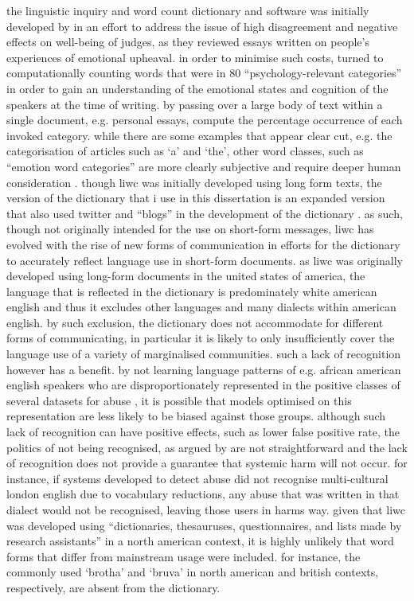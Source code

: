 the linguistic inquiry and word count dictionary and software was initially developed by \citet{pennebaker:2001} in an effort to address the issue of high disagreement and negative effects on well-being of judges, as they reviewed essays written on people's experiences of emotional upheaval. 
in order to minimise such costs, \citet{pennebaker:2001} turned to computationally counting words that were in $80$ ``psychology-relevant categories'' in order to gain an understanding of the emotional states and cognition of the speakers at the time of writing.
by passing over a large body of text within a single document, e.g. personal essays, \citet{pennebaker:2001} compute the percentage occurrence of each invoked category.
while there are some examples that appear clear cut, e.g. the categorisation of articles such as `a' and `the', other word classes, such as ``emotion word categories'' are more clearly subjective and require deeper human consideration \citep{tausczik:2010}.
though liwc was initially developed using long form texts, the version of the dictionary that i use in this dissertation is an expanded version that also used twitter and ``blogs'' in the development of the dictionary \citep{pennebaker:2015}.
as such, though not originally intended for the use on short-form messages, liwc has evolved with the rise of new forms of communication in efforts for the dictionary to accurately reflect language use in short-form documents.
as liwc was originally developed using long-form documents in the united states of america, the language that is reflected in the dictionary is predominately white american english and thus it excludes other languages and many dialects within american english.
by such exclusion, the dictionary does not accommodate for different forms of communicating, in particular it is likely to only insufficiently cover the language use of a variety of marginalised communities.
such a lack of recognition however has a benefit.
by not learning language patterns of e.g. african american english speakers who are disproportionately represented in the positive classes of several datasets for abuse \citep{waseem:2018,davidson:2019}, it is possible that models optimised on this representation are less likely to be biased against those groups.
although such lack of recognition can have positive effects, such as lower false positive rate, the politics of not being recognised, as argued by \citet{benjamin:2019} are not straightforward and the lack of recognition does not provide a guarantee that systemic harm will not occur.
for instance, if systems developed to detect abuse did not recognise multi-cultural london english due to vocabulary reductions, any abuse that was written in that dialect would not be recognised, leaving those users in harms way.
given that liwc was developed using ``dictionaries, thesauruses, questionnaires, and lists made by research assistants'' \citep{tausczik:2010} in a north american context, it is highly unlikely that word forms that differ from mainstream usage were included.
for instance, the commonly used `brotha' and `bruva' in north american and british contexts, respectively, are absent from the dictionary.
\vspace{5mm}


